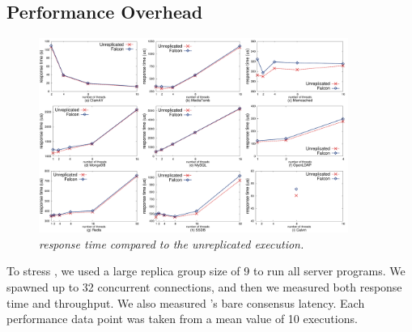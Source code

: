 % 


\subsection{Performance Overhead} \label{sec:overhead}

\begin{figure}[t]
\centering
\includegraphics[width=0.9\textwidth]{figures/latency}
\vspace{-.10in}
\caption{\small {\em \xxx response time compared to the unreplicated
execution.}}
\vspace{-.20in}
\label{fig:latency}
\end{figure}

To stress \xxx, we used a large replica group size of 9 to run all server 
programs. We spawned up to 32 concurrent connections, and then we measured both 
response 
time and throughput. We also measured \xxx's bare consensus latency. Each 
performance data point was taken from a mean value of 
10 executions.

